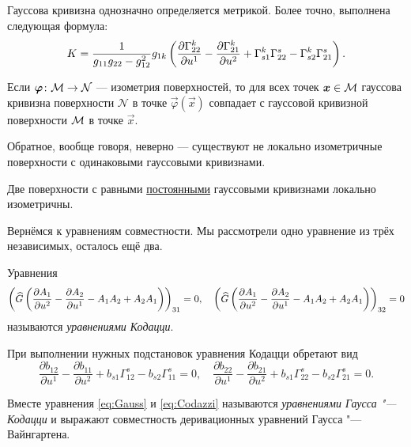 \begin{theorem}[Гаусс] \label{theorem:Gauss}
	Гауссова кривизна однозначно определяется метрикой. Более точно, выполнена следующая формула:
	\begin{equation} \label{eq:KfromG}
		K = \frac{1}{g_{11}g_{22} - g_{12}^2}g_{1k}\left(\frac{\partial\Gamma^k_{22}}{\partial u^1} - \frac{\partial\Gamma_{21}^k}{\partial u^2} + \Gamma_{s1}^k\Gamma^s_{22} - \Gamma_{s2}^k\Gamma_{21}^s\right).
	\end{equation}
\end{theorem}

\begin{corollary}
	Если $\boldsymbol{\varphi}\colon \mathcal{M} \to \mathcal{N}$ --- изометрия поверхностей, то для всех точек $\boldsymbol{x} \in \mathcal{M}$ гауссова кривизна поверхности $\mathcal{N}$ в точке $\vec{\varphi}(\vec{x})$ совпадает с гауссовой кривизной поверхности $\mathcal{M}$ в точке $\vec{x}$.
\end{corollary}

Обратное, вообще говоря, неверно --- существуют не локально изометричные поверхности с одинаковыми гауссовыми кривизнами. %

\begin{problem}
	Две поверхности с равными \underline{постоянными} гауссовыми кривизнами локально изометричны.
\end{problem}

Вернёмся к уравнениям совместности. Мы рассмотрели одно уравнение из трёх независимых, осталось ещё два.

\begin{definition}
	Уравнения
	\[
		\left(\widehat{G}\left(\frac{\partial A_1}{\partial u^2} - \frac{\partial A_2}{\partial u^1} - A_1A_2 + A_2A_1\right)\right)_{31} = 0,\quad
		\left(\widehat{G}\left(\frac{\partial A_1}{\partial u^2} - \frac{\partial A_2}{\partial u^1} - A_1A_2 + A_2A_1\right)\right)_{32} = 0
	\]
	называются \textit{уравнениями Кодацци}.
\end{definition}

\noindent
При выполнении нужных подстановок уравнения Кодацци обретают вид
\begin{equation} \label{eq:Codazzi}
	\frac{\partial b_{12}}{\partial u^1} - \frac{\partial b_{11}}{\partial u^2} + b_{s1}\Gamma_{12}^s - b_{s2}\Gamma_{11}^s = 0,\quad
	\frac{\partial b_{22}}{\partial u^1} - \frac{\partial b_{21}}{\partial u^2} + b_{s1}\Gamma_{22}^s - b_{s2}\Gamma_{21}^s = 0.
\end{equation}

Вместе уравнения \eqref{eq:Gauss} и \eqref{eq:Codazzi} называются \textit{уравнениями Гаусса "---Кодацци} и выражают совместность деривационных уравнений Гаусса "---Вайнгартена.

